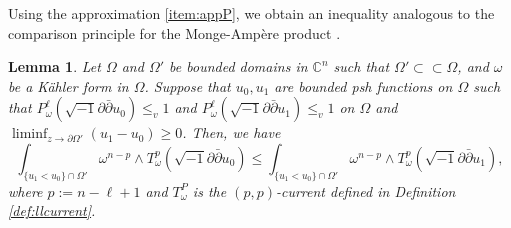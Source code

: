 \documentclass{amsart}
\numberwithin{equation}{section}
\theoremstyle{plain}
\newtheorem{lem}[equation]{Lemma}
\theoremstyle{definition}
\theoremstyle{remark}
\newcommand{\delb}{\sqrt{-1}\partial\bar{\partial}}
\begin{document}
Using the approximation \ref{item:appP}, we obtain an inequality analogous to the comparison principle for the Monge-Ampère product \cite[Theorem 4.1]{BT}. 


\begin{lem}\label{lem:comp}
    Let $\Omega$ and $\Omega'$ be bounded domains in $\mathbb{C}^n$ such that $\Omega'\subset\subset\Omega$, and $\omega$ be a Kähler form in $\Omega$. Suppose that $u_0,u_1$ are bounded psh functions on $\Omega$ such that $P^{\ell}_\omega(\delb u_0)\le_v1$ and $P^{\ell}_\omega(\delb u_1)\le_v1$ on $\Omega$ and $\liminf_{z\to\partial\Omega'} (u_1-u_0)\ge 0$. Then, we have
    \begin{equation}
        \int_{\{u_1<u_0\}\cap\Omega'}\omega^{n-p}\wedge T^p_\omega(\delb u_0)\le\int_{\{u_1<u_0\}\cap\Omega'}\omega^{n-p}\wedge T^p_\omega(\delb u_1),
    \end{equation}
    where $p:=n-\ell+1$ and $T^P_\omega$ is the $(p,p)$-current defined in Definition \ref{def:llcurrent}.
\end{lem}
\end{document}
